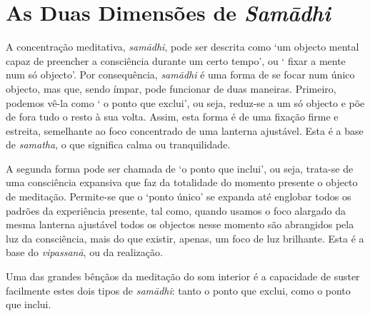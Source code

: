 \chapter{As Duas Dimensões de \emph{Samādhi}}

A concentração meditativa, \emph{samādhi}, pode ser descrita como `um
objecto mental capaz de preencher a consciência durante um certo tempo',
ou ` fixar a mente num só objecto'. Por consequência, \emph{samādhi} é
uma forma de se focar num único objecto, mas que, sendo ímpar, pode
funcionar de duas maneiras. Primeiro, podemos vê-la como ` o ponto que
exclui', ou seja, reduz-se a um só objecto e põe de fora tudo o resto à
sua volta. Assim, esta forma é de uma fixação firme e estreita,
semelhante ao foco concentrado de uma lanterna ajustável. Esta é a base
de \emph{samatha}, o que significa calma ou tranquilidade.

A segunda forma pode ser chamada de `o ponto que inclui', ou seja,
trata-se de uma consciência expansiva que faz da totalidade do momento
presente o objecto de meditação. Permite-se que o `ponto único' se
expanda até englobar todos os padrões da experiência presente, tal como,
quando usamos o foco alargado da mesma lanterna ajustável todos os
objectos nesse momento são abrangidos pela luz da consciência, mais do
que existir, apenas, um foco de luz brilhante. Esta é a base do
\emph{vipassanā}, ou da realização.

Uma das grandes bênçãos da meditação do som interior é a capacidade de
suster facilmente estes dois tipos de \emph{samādhi}: tanto o ponto que
exclui, como o ponto que inclui.

